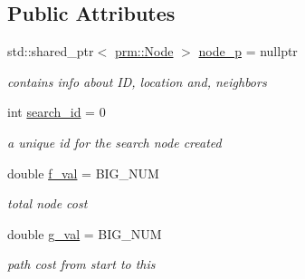\subsection*{Public Attributes}
\begin{DoxyCompactItemize}
\item 
\mbox{\label{structhsearch_1_1SearchNode_a891ec15f4f07e474fda39978a6ca6902}} 
std\+::shared\+\_\+ptr$<$ \hyperlink{structprm_1_1Node}{prm\+::\+Node} $>$ \hyperlink{structhsearch_1_1SearchNode_a891ec15f4f07e474fda39978a6ca6902}{node\+\_\+p} = nullptr
\begin{DoxyCompactList}\small\item\em contains info about ID, location and, neighbors \end{DoxyCompactList}\item 
\mbox{\label{structhsearch_1_1SearchNode_ab0e32e34e1e2682c0cc7968df6dd7b85}} 
int \hyperlink{structhsearch_1_1SearchNode_ab0e32e34e1e2682c0cc7968df6dd7b85}{search\+\_\+id} = 0
\begin{DoxyCompactList}\small\item\em a unique id for the search node created \end{DoxyCompactList}\item 
\mbox{\label{structhsearch_1_1SearchNode_a0f9510192452ac5efd6733eadfee38c2}} 
double \hyperlink{structhsearch_1_1SearchNode_a0f9510192452ac5efd6733eadfee38c2}{f\+\_\+val} = B\+I\+G\+\_\+\+N\+UM
\begin{DoxyCompactList}\small\item\em total node cost \end{DoxyCompactList}\item 
\mbox{\label{structhsearch_1_1SearchNode_afc0b32b3c3c748e6585b76fc53553063}} 
double \hyperlink{structhsearch_1_1SearchNode_afc0b32b3c3c748e6585b76fc53553063}{g\+\_\+val} = B\+I\+G\+\_\+\+N\+UM
\begin{DoxyCompactList}\small\item\em path cost from start to this \end{DoxyCompactList}\item 
\mbox{\label{structhsearch_1_1SearchNode_a8e25282237951762ced727eb0097abd9}} 

\end{DoxyCompactItemize}
